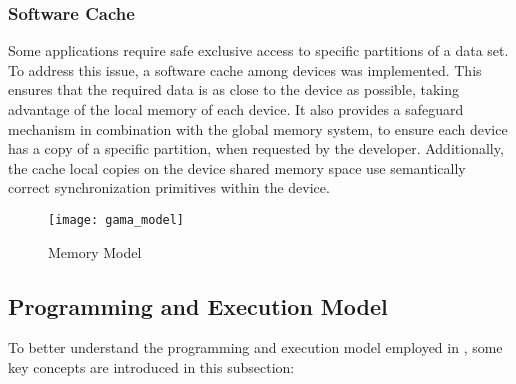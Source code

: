 \documentclass[main.tex]{subfiles}
\begin{document}
\subsubsection{Software Cache}

Some applications require safe exclusive access to specific partitions of a data set. To address this issue, a software cache among devices was implemented. This ensures that the required data is as close to the device as possible, taking advantage of the local memory of each device. It also provides a safeguard mechanism in combination with the global memory system, to ensure each device has a copy of a specific partition, when requested by the developer. Additionally, the cache local copies on the device shared memory space use semantically correct synchronization primitives within the device.

\begin{figure}[!htp]
  \centering
  \texttt{[image: gama\_model]}
  \caption{\gama Memory Model \label{fig:gama_memory_model}}
\end{figure}





\subsection{Programming and Execution Model}

To better understand the programming and execution model employed in \gama, some key concepts are introduced in this subsection:
\end{document}
